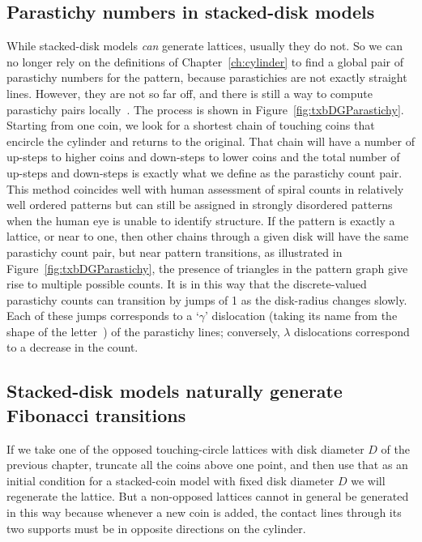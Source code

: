 \subsection{Parastichy numbers in stacked-disk models}
While stacked-disk models \textit{can} generate lattices, usually they do not. 
So we can no longer rely on the  definitions of Chapter~\ref{ch:cylinder}
to find a global pair of parastichy numbers for the pattern, because  parastichies are not exactly straight lines.  However, they are not so far off, and there is still a way to compute parastichy pairs locally~\autocite{goleFibonacciQuasisymmetricPhyllotaxis2016}.
The process is shown in Figure~\ref{fig:txbDGParastichy}. Starting from one coin, we look for a shortest chain of touching coins that encircle the cylinder and returns to the original. That chain will have a number of up-steps to higher coins and down-steps to lower coins and the total number of up-steps and down-steps is exactly what we define as the parastichy count pair. 
%
This method coincides well with human assessment of spiral counts in relatively well ordered patterns but can still be assigned in strongly disordered patterns when the human eye is unable to identify structure. 
%	 
	 If the pattern is exactly a lattice, or near to one,
	 then other chains  through a given disk will have the same parastichy count pair, but near pattern transitions, as illustrated in Figure~\ref{fig:txbDGParastichy}, the presence of triangles in the pattern graph give rise to  multiple possible  counts. It is in this way that the discrete-valued parastichy counts can transition by jumps of 1 as the disk-radius changes slowly. 
	 Each of these jumps corresponds to a `$\gamma$' dislocation (taking its name from the shape of the letter~\cite{zagorska-marekPhyllotacticPatternsTransitions1985}) of the parastichy lines; conversely, $\lambda$ dislocations correspond to a decrease in the count.


\clearpage
\subsection{Stacked-disk models naturally generate Fibonacci transitions}
%
%
If we take one of the opposed touching-circle lattices with disk diameter $D$ of the previous chapter, truncate all the coins above one  point, and then use that as an initial condition for a stacked-coin model with fixed disk diameter $D$ we will regenerate the lattice. But a non-opposed lattices cannot in general be generated in this way because 
whenever a new coin is added, the contact lines through its two supports must be in opposite directions on the cylinder. 


